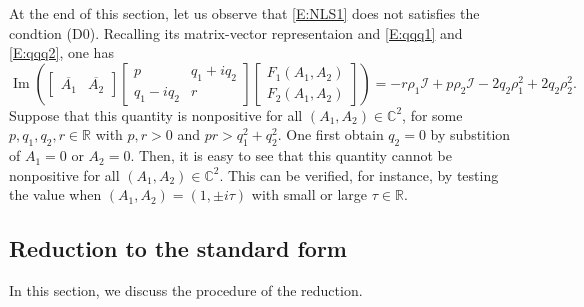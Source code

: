 \documentclass[11pt,a4paper,oneside]{amsart}
\theoremstyle{plain}
\theoremstyle{remark}
\numberwithin{equation}{section}
\newcommand{\C}{\mathbb{C}}
\newcommand{\R}{\mathbb{R}}
\renewcommand{\Im}{\operatorname{Im}}
\def\({\left(}
\def\){\right)}
\theoremstyle{definition}
\begin{document}
At the end of this section, let us observe that \eqref{E:NLS1} does not satisfies the condtion (D0).
Recalling its matrix-vector representaion and \eqref{E:qqq1} and \eqref{E:qqq2}, one has
\[
		\Im \(\begin{bmatrix} 
	\overline{A_1} & \overline{A_2} 
	\end{bmatrix}
	\begin{bmatrix}
	p & q_1 + i q_2 \\ q_1 - i q_2 & r
	\end{bmatrix}
	\begin{bmatrix}
	F_1 (A_1,A_2) \\
	F_2 (A_1,A_2)
	\end{bmatrix}
	\) = -r \rho_1 \mathcal{I} + p \rho_2 \mathcal{I} -2 q_2 \rho_1^2 + 2 q_2 \rho_2^2.
\]
Suppose that this quantity is nonpositive for all $(A_1,A_2)\in \C^2$, for some $p,q_1,q_2,r \in \R$ with $p,r>0$ and $pr>q_1^2+q_2^2$.
One first obtain $q_2=0$ by substition of $A_1=0$ or $A_2=0$. 
Then, it is easy to see that this quantity cannot be nonpositive for all $(A_1,A_2)\in \C^2$. This can be verified, for instance,
by testing the value when $(A_1,A_2)=(1,\pm i \tau)$
with small or large $\tau\in\R$.


\subsection{Reduction to the standard form}\label{S:std}
In this section, we discuss the procedure of the reduction.
\end{document}
